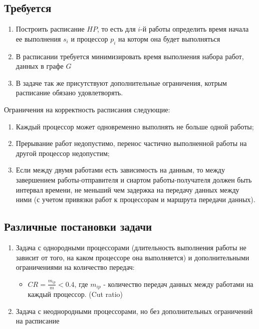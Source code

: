 \subsection{Требуется}
\begin{enumerate}
    \item Построить расписание $HP$, то есть для $i$-й работы определить время начала ее выполнения $s_i$ и процессор $p_i$ на которм она будет выполняться
    \item В расписании требуется минимизировать время выполнения набора работ, данных в графе $G$
    \item В задаче так же присутствуют дополнительные ограничения, котрым расписание обязано удовлетворять.
\end{enumerate}
Ограничения на корректность расписания следующие:
\begin{enumerate}
    \item Каждый процессор может одновременно выполнять не больше одной работы;
    \item Прерывание работ недопустимо, перенос частично выполненной работы на другой процессор недопустим;
    \item Если между двумя работами есть зависимость на данным, то между завершением работы-отправителя и сиартом работы-получателя должен быть интервал времени, не меньший чем задержка на передачу данных между ними (с учетом привязки работ к процессорам и маршрута передачи данных).
\end{enumerate}
\subsection{Различные постановки задачи} \label{sec:crit}
\begin{enumerate}
    \item Задача с однородными процессорами (длительность выполнения работы не зависит от того, на каком процессоре она выполняется) и дополнительными ограничениями на количество передач:
          \begin{itemize}
              \item $CR = \frac{m_{ip}}{m} < 0.4$, где $m_{ip}$ - количество передач данных между работами на каждый процессор. (Cut ratio)
          \end{itemize}
    \item Задача с неоднородными процессорами, но без дополнительных ограничений на расписание
\end{enumerate}